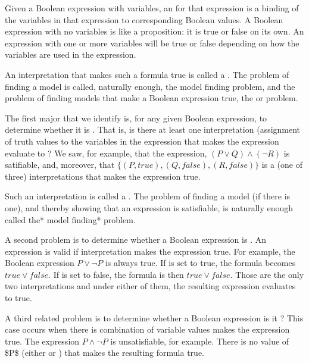 \documentclass[letterpaper,10pt,english]{sphinxmanual}
\begin{document}
Given a Boolean expression with variables, an  for
that expression is a binding of the variables in that expression to
corresponding Boolean values. A Boolean expression with no variables
is like a proposition: it is true or false on its own. An expression
with one or more variables will be true or false depending on how the
variables are used in the expression.

An interpretation that makes such a formula true is called a .
The problem of finding a model is called, naturally enough, the model
finding problem, and the problem of finding  models that make a
Boolean expression true, the  or 
problem.

The first major  that we identify is, for any given
Boolean expression, to determine whether it is . That is,
is there at least one interpretation (assignment of truth values to
the variables in the expression that makes the expression evaluate to
?  We saw, for example, that the expression, \((P \lor Q)
\land (\lnot R)\) is satifiable, and, moreover, that \(\{ (P,
true), (Q, false), (R, false) \}\) is a (one of three) interpretations
that makes the expression true.

Such an interpretation is called a . The problem of finding a
model (if there is one), and thereby showing that an expression is
satisfiable, is naturally enough called the* model finding* problem.

A second problem is to determine whether a Boolean expression is
. An expression is valid if  interpretation makes the
expression true. For example, the Boolean expression \(P \lor
\neg P\) is always true. If  is set to true, the formula becomes
\(true \lor false\). If  is set to false, the formula is then
\(true \lor false\). Those are the only two interpretations and
under either of them, the resulting expression evaluates to true.

A third related problem is to determine whether a Boolean expression
is it ? This case occurs when there is  combination
of variable values makes the expression true. The expression \(P
\land \neg P\) is unsatisfiable, for example. There is no value of \$P\$
(either  or ) that makes the resulting formula true.
\end{document}
